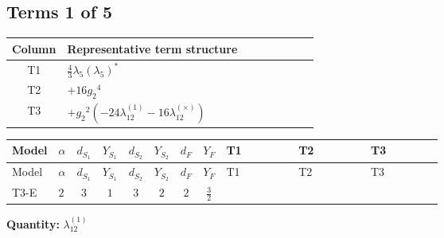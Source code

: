 \documentclass[8pt]{article}
\begin{document}
\begin{landscape}
\subsection*{Terms 1 of 5}
\begin{center}
\begin{tabular}{@{}c >{\raggedright\arraybackslash}p{0.82\linewidth}@{}}
\toprule
Column & Representative term structure \\
\midrule
T1 & \(\displaystyle \frac{4}{3} {\lambda_5} \left({\lambda_5}\right)^{*}\) \\
\midrule
T2 & \(\displaystyle +16 {g_2}^4\) \\
\midrule
T3 & \(\displaystyle +{g_2}^2 (-24 {\lambda_{12}^{(1)}}-16 {\lambda_{12}^{(\times)}})\) \\
\midrule
\bottomrule
\end{tabular}
\end{center}
\smallskip
\tiny
\begin{longtable}{@{}llcccccc >{\raggedright\arraybackslash}p{0.21\linewidth} >{\raggedright\arraybackslash}p{0.21\linewidth} >{\raggedright\arraybackslash}p{0.21\linewidth}@{}}
\toprule
Model & $\alpha$ & $d_{S_1}$ & $Y_{S_1}$ & $d_{S_2}$ & $Y_{S_2}$ & $d_F$ & $Y_F$ & T1 & T2 & T3 \\
\midrule
\endfirsthead
\toprule
Model & $\alpha$ & $d_{S_1}$ & $Y_{S_1}$ & $d_{S_2}$ & $Y_{S_2}$ & $d_F$ & $Y_F$ & T1 & T2 & T3 \\
\midrule
\endhead
T3-E & $2$ & $3$ & $1$ & $3$ & $2$ & $2$ & $\frac{3}{2}$ & \scriptsize\adjustbox{max width=\linewidth}{$\begin{gathered} \frac{4}{3} {\lambda_5} \left({\lambda_5}\right)^{*}\end{gathered}$} & \scriptsize\adjustbox{max width=\linewidth}{$\begin{gathered} +16 {g_2}^4\end{gathered}$} & \scriptsize\adjustbox{max width=\linewidth}{$\begin{gathered} +{g_2}^2 (-24 {\lambda_{12}^{(1)}}-16 {\lambda_{12}^{(\times)}})\end{gathered}$} \\
\midrule
\bottomrule
\end{longtable}
\clearpage
\noindent\textbf{Quantity: }$\lambda_{12}^{(1)}$\par\smallskip

\end{landscape}
\end{document}
